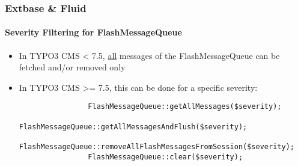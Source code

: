 %

\begin{frame}[fragile]
	\frametitle{Extbase \& Fluid}
	\framesubtitle{Severity Filtering for FlashMessageQueue}

	\begin{itemize}

		\item In TYPO3 CMS < 7.5, \underline{all} messages of the FlashMessageQueue can be
			fetched and/or removed only

		\item In TYPO3 CMS >= 7.5, this can be done for a specific severity:

			\begin{lstlisting}
				FlashMessageQueue::getAllMessages($severity);
				FlashMessageQueue::getAllMessagesAndFlush($severity);
				FlashMessageQueue::removeAllFlashMessagesFromSession($severity);
				FlashMessageQueue::clear($severity);
			\end{lstlisting}

	\end{itemize}

\end{frame}


